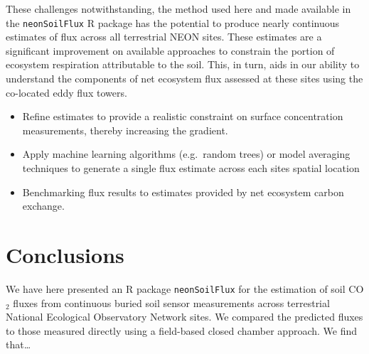 \documentclass[
  letterpaper,
  DIV=11,
  numbers=noendperiod]{scrartcl}
\providecommand{\tightlist}{%
  \setlength{\itemsep}{0pt}\setlength{\parskip}{0pt}}\usepackage{longtable,booktabs,array}
\begin{document}
These challenges notwithstanding, the method used here and made
available in the \texttt{neonSoilFlux} R package has the potential to
produce nearly continuous estimates of flux across all terrestrial NEON
sites. These estimates are a significant improvement on available
approaches to constrain the portion of ecosystem respiration
attributable to the soil. This, in turn, aids in our ability to
understand the components of net ecosystem flux assessed at these sites
using the co-located eddy flux towers.

\begin{itemize}
\tightlist
\item
  Refine estimates to provide a realistic constraint on surface
  concentration measurements, thereby increasing the gradient.
\item
  Apply machine learning algorithms (e.g.~random trees) or model
  averaging techniques to generate a single flux estimate across each
  sites spatial location
\item
  Benchmarking flux results to estimates provided by net ecosystem
  carbon exchange.
\end{itemize}

\section{Conclusions}\label{conclusions}

We have here presented an R package \texttt{neonSoilFlux} for the
estimation of soil CO\(_{2}\) fluxes from continuous buried soil sensor
measurements across terrestrial National Ecological Observatory Network
sites. We compared the predicted fluxes to those measured directly using
a field-based closed chamber approach. We find that\ldots{}
\end{document}
